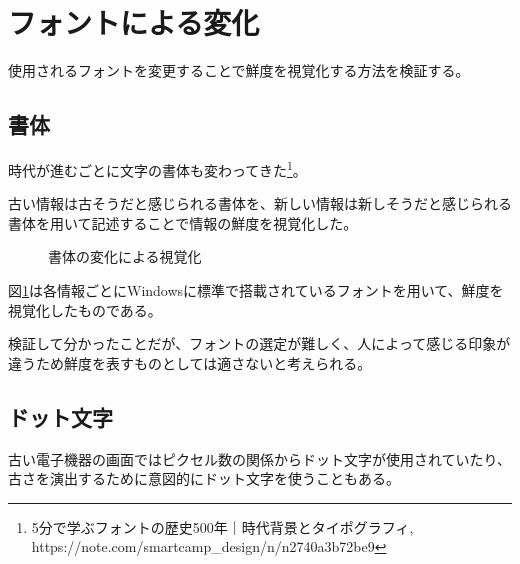 \section{フォントによる変化}
\label{sec:ver_font}

使用されるフォントを変更することで鮮度を視覚化する方法を検証する。

\subsection{書体}
\label{subsec:ver_fnt_stl}

時代が進むごとに文字の書体も変わってきた\footnote{5分で学ぶフォントの歴史500年｜時代背景とタイポグラフィ, https://note.com/smartcamp_design/n/n2740a3b72be9}。

古い情報は古そうだと感じられる書体を、新しい情報は新しそうだと感じられる書体を用いて記述することで情報の鮮度を視覚化した。

\begin{figure}[htbp]
  \begin{center}
  \end{center}
  \caption{書体の変化による視覚化}
  \label{fig:ver_style}
\end{figure}

図\ref{fig:ver_style}は各情報ごとにWindowsに標準で搭載されているフォントを用いて、鮮度を視覚化したものである。

検証して分かったことだが、フォントの選定が難しく、人によって感じる印象が違うため鮮度を表すものとしては適さないと考えられる。

\subsection{ドット文字}
\label{subsec:ver_fnt_dot}

古い電子機器の画面ではピクセル数の関係からドット文字が使用されていたり、古さを演出するために意図的にドット文字を使うこともある。

